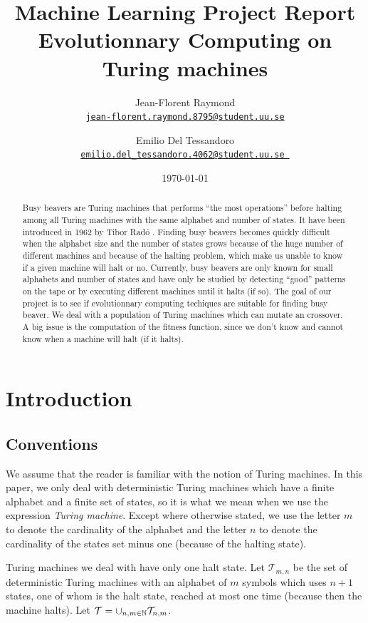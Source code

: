\documentclass{report}
\title{Machine Learning Project Report\\\textbf{Evolutionnary Computing on\\Turing machines}}
\author{Jean-Florent Raymond\\\href{mailto:jean-florent.raymond.8795@student.uu.se}{\texttt{jean-florent.raymond.8795@student.uu.se}} \and Emilio Del Tessandoro\\
  \href{mailto:emilio.del_tessandoro.4062@student.uu.se }{\texttt{emilio.del\_tessandoro.4062@student.uu.se }}}
\date{\today}
\begin{document}
\maketitle

\begin{abstract}
  Busy beavers are Turing machines that performs ``the most operations'' before halting among all Turing machines with the same alphabet and number of states. It have been introduced in 1962 by Tibor Radó \cite{rado}. Finding busy beavers becomes quickly difficult when the alphabet size and the number of states grows because of the huge number of different machines and because of the halting problem, which make us unable to know if a given machine will halt or no. Currently, busy beavers are only known for small alphabets and number of states and have only be studied by detecting ``good'' patterns on the tape or by executing different machines until it halts (if so).
  The goal of our project is to see if evolutionnary computing techiques are suitable for finding busy beaver. We deal with a population of Turing machines which can mutate an crossover. A big issue is the computation of the fitness function, since we don't know and cannot know when a machine will halt (if it halts).
\end{abstract}

\chapter{Introduction}
\label{chap:intro}

\section{Conventions}

We assume that the reader is familiar with the notion of Turing machines. In this paper, we only deal with deterministic Turing machines which have a finite alphabet and a finite set of states, so it is what we mean when we use the expression \emph{Turing machine}. Except where otherwise stated, we use the letter $m$ to denote the cardinality of the alphabet and the letter $n$ to denote the cardinality of the states set minus one (because of the halting state).

Turing machines we deal with have only one halt state. Let $\mathcal{T}_{m,n}$ be the set of deterministic Turing machines with an alphabet of $m$ symbols which uses $n + 1$ states, one of whom is the halt state, reached at most one time (because then the machine halts). Let  $\mathcal{T} = \cup_{n,m \in \mathbb{N}} \mathcal{T}_{n,m}$.
\end{document}
